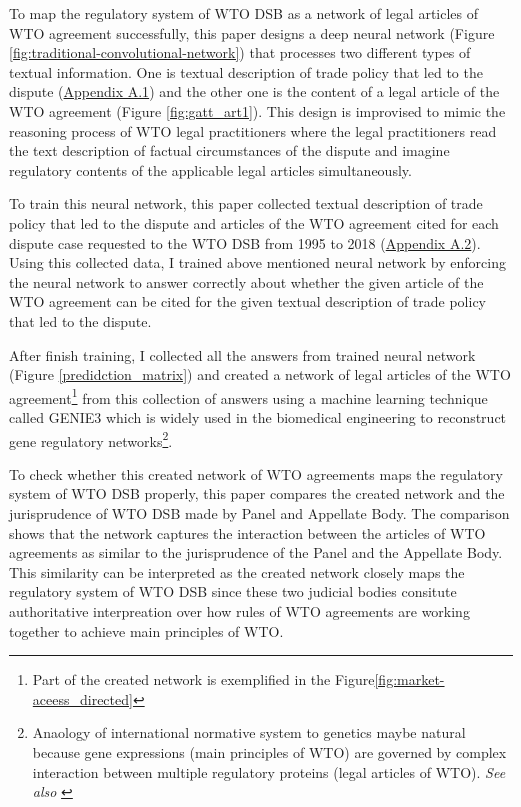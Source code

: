 To map the regulatory system of WTO DSB as 
a network of legal articles of WTO agreement 
successfully,
this paper designs a deep neural network (Figure \ref{fig:traditional-convolutional-network}) that
processes two different types of textual information.
One is textual description of trade policy that led to the dispute (\hyperref[sub:factual-aspect-example]{Appendix A.1}) and
the other one is the content of a legal article of the WTO agreement (Figure \ref{fig:gatt_art1}).
This design is improvised to mimic
the reasoning process of WTO legal practitioners
where the legal practitioners read
the text description of
factual circumstances of the dispute and imagine regulatory contents of
the applicable legal articles simultaneously.


To train this neural network, this paper collected textual description of trade policy 
that led to the dispute and articles of the WTO agreement cited for each dispute
case requested to the WTO DSB 
from 1995 to 2018 (\hyperref[sub:cited-articles-table]{Appendix A.2}).
Using this collected data, I trained above mentioned neural network by enforcing the neural network to answer correctly 
about whether the given article of the WTO agreement
can be cited for the given textual description of 
trade policy that led to the dispute.

After finish training, I collected all the answers from trained neural network (Figure \ref{predidction_matrix})
and created a network of legal articles of the WTO agreement\footnote{Part of the created network is exemplified in the Figure\ref{fig:market-aceess_directed}} from this collection of answers using a machine learning technique called GENIE3 \citep{genie3} 
which is widely used in the biomedical engineering to reconstruct gene regulatory networks\footnote{Anaology of international normative system to genetics maybe natural because gene expressions (main principles of WTO) are governed by complex interaction between multiple regulatory proteins (legal articles of WTO). \textit{See also} \cite{gene_analogy}}.

To check whether this created network of WTO agreements maps the regulatory system of WTO DSB properly, this paper
compares the created network and the jurisprudence of WTO DSB made by Panel and Appellate Body. 
The comparison shows that the network captures the interaction between the articles of WTO agreements
as similar to the jurisprudence of the Panel and the Appellate Body. This similarity can be interpreted 
as the created network closely maps the regulatory system of WTO DSB since these two judicial bodies 
consitute authoritative interpreation over how rules of WTO agreements are working together to achieve
main principles of WTO.

